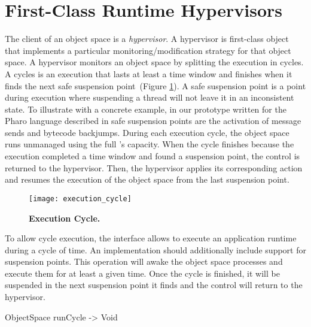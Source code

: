 
\section{First-Class Runtime Hypervisors}\label{sec:hypervisor}

The client of an object space is a \emph{hypervisor}. A hypervisor is first-class object that implements a particular monitoring/modification strategy for that object space. A hypervisor monitors an object space by splitting the execution in cycles. A cycles is an execution that lasts at least a time window and finishes when it finds the next safe suspension point~(Figure \ref{fig:execution_cycle}). A safe suspension point is a point during execution where suspending a thread will not leave it in an inconsistent state. To illustrate with a concrete example, in our \Vtt prototype written for the Pharo language described in  safe suspension points are the activation of message sends and bytecode backjumps. During each execution cycle, the object space runs unmanaged using the full \VM's capacity. When the cycle finishes because the execution completed a time window and found a suspension point, the control is returned to the hypervisor. Then, the hypervisor applies its corresponding action and resumes the execution of the object space from the last suspension point.

\begin{figure}[ht]
\center
\texttt{[image: execution\_cycle]}
\caption{\textbf{Execution Cycle.} \label{fig:execution_cycle}}
\end{figure}

To allow cycle execution, the  interface allows to execute an application runtime during a cycle of time. An \Vtt implementation should additionally include support for suspension points. This operation will awake the object space processes and execute them for at least a given time. Once the cycle is finished, it will be suspended in the next suspension point it finds and the control will return to the hypervisor.

\begin{code}
ObjectSpace {
    runCycle -> Void
}
\end{code}


